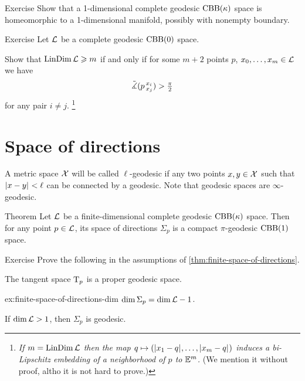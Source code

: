 \begin{thm}{Exercise}\label{ex:dim=1}
Show that a 1-dimensional complete geodesic $\mathrm{CBB}(\kappa)$ space is homeomorphic to a 1-dimensional manifold, possibly with nonempty boundary.
\end{thm}


\begin{thm}{Exercise}\label{ex:resporka}
Let $\mathcal{L}$ be a complete geodesic $\mathrm{CBB}(0)$ space.

Show that $\mathop{\rm LinDim}\nolimits \mathcal{L}\geqslant m$ if and only if for some $m+2$ points $p$, $x_0,\z\dots, x_{m}\in \spc{L}$
we have
\[\tilde\measuredangle(p\,{}^{x_i}_{x_j})>\tfrac\pi2\]
for any pair $i\ne j$.%
\footnote{\textit{If $m=\mathop{\rm LinDim}\nolimits \mathcal{L}$ then the map $q\mapsto (\dist{x_1}{q}{},\dots,\dist{x_m}{q}{})$ induces a bi-Lipschitz embedding of a neighborhood of $p$ to $\mathbb{E}^m$.}
(We mention it without proof, altho it is not hard to prove.)}
\end{thm}

\section{Space of directions}

A metric space $\mathcal{X}$ will be called $\ell$-geodesic 
if any two points $x,y\in\mathcal{X}$ such that $\dist{x}{y}{}<\ell$ can be connected by a geodesic.
Note that geodesic spaces are $\infty$-geodesic.

\begin{thm}{Theorem}\label{thm:finite-space-of-directions}
Let $\mathcal{L}$ be a finite-dimensional complete geodesic $\mathrm{CBB}(\kappa)$ space.
Then for any point $p\in \mathcal{L}$, its space of directions $\Sigma_p$ is a compact $\pi$-geodesic $\mathrm{CBB}(1)$ space.
\end{thm}


\begin{thm}{Exercise}\label{ex:finite-tan}
Prove the following in the assumptions of \ref{thm:finite-space-of-directions}.
\begin{subthm}{}
The tangent space $\mathrm{T}_p$ is a proper geodesic space.
\end{subthm}

\begin{subthm}{ex:finite-space-of-directions-dim}
$\operatorname{\rm dim}\nolimits\Sigma_p=\operatorname{\rm dim}\nolimits\mathcal{L}-1$.
\end{subthm}

\begin{subthm}{}
If $\operatorname{\rm dim}\nolimits \mathcal{L}>1$, then $\Sigma_p$ is geodesic.
\end{subthm}


\end{thm}


